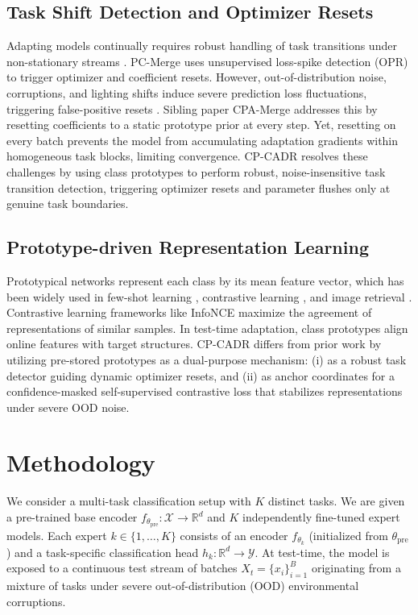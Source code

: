 \documentclass{article}
\theoremstyle{plain}
\theoremstyle{definition}
\theoremstyle{remark}
\begin{document}
\subsection{Task Shift Detection and Optimizer Resets}
Adapting models continually requires robust handling of task transitions under non-stationary streams \cite{kirkpatrick17, zenke17, cha21}. PC-Merge \cite{choi24} uses unsupervised loss-spike detection (OPR) to trigger optimizer and coefficient resets. However, out-of-distribution noise, corruptions, and lighting shifts induce severe prediction loss fluctuations, triggering false-positive resets \cite{hendrycks19, subbaswamy19}. Sibling paper CPA-Merge addresses this by resetting coefficients to a static prototype prior at every step. Yet, resetting on every batch prevents the model from accumulating adaptation gradients within homogeneous task blocks, limiting convergence. CP-CADR resolves these challenges by using class prototypes to perform robust, noise-insensitive task transition detection, triggering optimizer resets and parameter flushes only at genuine task boundaries.

\subsection{Prototype-driven Representation Learning}
Prototypical networks \cite{snell17} represent each class by its mean feature vector, which has been widely used in few-shot learning \cite{snell17}, contrastive learning \cite{he20, chen20, caron20}, and image retrieval \cite{schroff15, sohn16}. Contrastive learning frameworks like InfoNCE \cite{oord18, hadsell06} maximize the agreement of representations of similar samples. In test-time adaptation, class prototypes align online features with target structures. CP-CADR differs from prior work by utilizing pre-stored prototypes as a dual-purpose mechanism: (i) as a robust task detector guiding dynamic optimizer resets, and (ii) as anchor coordinates for a confidence-masked self-supervised contrastive loss that stabilizes representations under severe OOD noise.

\section{Methodology}
\label{sec:method}
We consider a multi-task classification setup with $K$ distinct tasks. We are given a pre-trained base encoder $f_{\theta_{\text{pre}}} : \mathcal{X} \to \mathbb{R}^d$ and $K$ independently fine-tuned expert models. Each expert $k \in \{1, \dots, K\}$ consists of an encoder $f_{\theta_k}$ (initialized from $\theta_{\text{pre}}$) and a task-specific classification head $h_k : \mathbb{R}^d \to \mathcal{Y}$. At test-time, the model is exposed to a continuous test stream of batches $X_t = \{x_i\}_{i=1}^B$ originating from a mixture of tasks under severe out-of-distribution (OOD) environmental corruptions.
\end{document}
